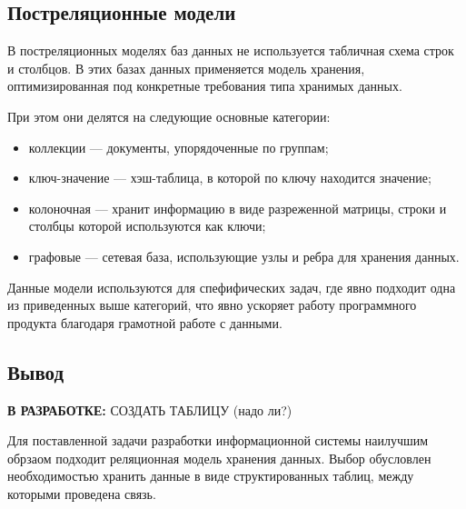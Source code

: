 \subsection{Постреляционные модели}

В постреляционных моделях баз данных \cite{db-nosql} не используется табличная схема строк и столбцов. В этих базах данных применяется модель хранения, оптимизированная под конкретные требования типа хранимых данных.

При этом они делятся на следующие основные категории:

\begin{itemize}
    \item коллекции --- документы, упорядоченные по группам;
    \item ключ-значение --- хэш-таблица, в которой по ключу находится значение;
    \item колоночная --- хранит информацию в виде разреженной матрицы, строки и столбцы которой используются как ключи;
    \item графовые --- сетевая база, использующие узлы и ребра для хранения данных.
\end{itemize}

Данные модели используются для спефифических задач, где явно подходит одна из приведенных выше категорий, что явно ускоряет работу программного продукта благодаря грамотной работе с данными.


\subsection*{Вывод}

\textbf{В РАЗРАБОТКЕ:} СОЗДАТЬ ТАБЛИЦУ (надо ли?)

Для поставленной задачи разработки информационной системы наилучшим обрзаом подходит реляционная модель хранения данных. Выбор обусловлен необходимостью хранить данные в виде структированных таблиц, между которыми проведена связь. 







